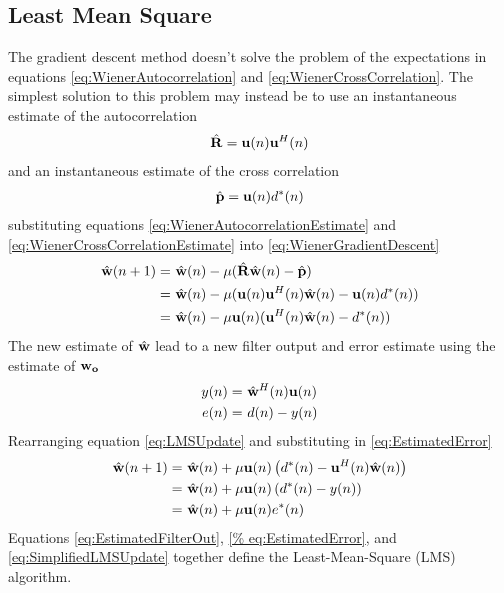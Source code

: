\subsection{Least Mean Square}
\label{sec:LMS}
The gradient descent method doesn't solve the problem of %
the expectations in equations \ref{eq:WienerAutocorrelation} %
and \ref{eq:WienerCrossCorrelation}. The simplest solution %
to this problem may instead be to use an instantaneous %
estimate of the autocorrelation
\begin{align}
	\hat{\bold{R}} = \bold{u}(n)\bold{u}^{H}(n)
	\label{eq:WienerAutocorrelationEstimate}
\end{align}
and an instantaneous estimate of the cross correlation
\begin{align}
	\hat{\bold{p}} = \bold{u}(n)d^{*}(n)
	\label{eq:WienerCrossCorrelationEstimate}
\end{align}
substituting equations \ref{eq:WienerAutocorrelationEstimate} %
and \ref{eq:WienerCrossCorrelationEstimate} into %
\ref{eq:WienerGradientDescent}
\begin{align}
	\hat{\bold{w}}(n+1) =&~\hat{\bold{w}}(n)-\mu(
	\hat{\bold{R}}\hat{\bold{w}}(n) - \hat{
	\bold{p}})\\
	=&~\hat{\bold{w}}(n) - \mu(\bold{u}(n)
	\bold{u}^{H}(n)\hat{\bold{w}}(n) - 
	\bold{u}(n)d^{*}(n))\\
	=&~\hat{\bold{w}}(n) - \mu\bold{u}(n)(
	\bold{u}^{H}(n)\hat{\bold{w}}(n) - d^{*}
	(n))
	\label{eq:LMSUpdate}
\end{align}
The new estimate of $\hat{\bold{w}}$ lead %
to a new filter output and error estimate %
using the estimate of $\bold{w_{o}}$ 
\begin{align}
	y(n) =&~\hat{\bold{w}}^{H}(n)\bold{u}(n)
	\label{eq:EstimatedFilterOut}\\
	e(n) =&~d(n) - y(n)
	\label{eq:EstimatedError}
\end{align}
Rearranging equation \ref{eq:LMSUpdate} and substituting %
in \ref{eq:EstimatedError}
\begin{align}
	\hat{\bold{w}}(n+1) =&~\hat{\bold{w}}(n) + 
	\mu\bold{u}(n)\left(d^{*}(n) - \bold{u}^{H}
	(n)\hat{\bold{w}}(n)\right)\\
	=&~\hat{\bold{w}}(n) + \mu\bold{u}(n)\left(
	d^{*}(n) - y(n)\right)\\
	=&~\hat{\bold{w}}(n) + \mu\bold{u}(n)e^{*}(n)
	\label{eq:SimplifiedLMSUpdate}
\end{align}
Equations \ref{eq:EstimatedFilterOut}, \ref{%
eq:EstimatedError}, and \ref{eq:SimplifiedLMSUpdate} %
together define the Least-Mean-Square (LMS) algorithm. %
